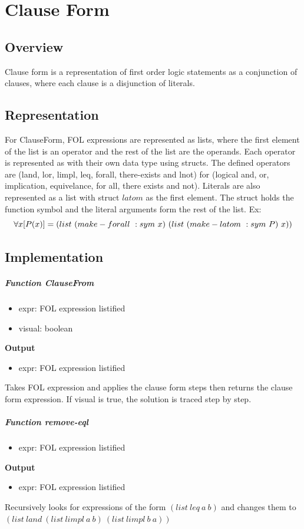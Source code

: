 \documentclass[paper=a4, fontsize=11pt]{scrartcl}
\numberwithin{equation}{section}		%
\numberwithin{figure}{section}			%
\numberwithin{table}{section}				%
\begin{document}
\section{Clause Form}
\subsection{Overview}
Clause form is a representation of first order logic
statements as a conjunction of clauses, where each clause is a disjunction of
literals.


\subsection{Representation}
For ClauseForm, FOL expressions are represented as lists, where the first
element of the list is an operator and the rest of the list are the operands.
Each operator is represented as with their own data type using structs. The
defined operators are (land, lor, limpl, leq, forall, there-exists and lnot) for
(logical and, or, implication, equivelance, for all, there exists and not).
Literals are also represented as a list with struct $latom$ as the first
element. The struct holds the function symbol and the literal arguments form the
rest of the list. 
Ex: \\
\[
  \forall x[P(x)] = \\
  (list\ (make-forall\ :sym\ x)\ (list\ (make-latom\ :sym\ P)\
  x)) 
\]

\subsection{Implementation}


\subparagraph{Function ClauseFrom}
\begin{itemize}
  \item {expr:} FOL expression listified
  \item{visual:} boolean
\end{itemize}
\noindent\textbf{Output}
\begin{itemize}
    \item{expr:} FOL expression listified
\end{itemize}
Takes FOL expression and applies the clause form steps then returns the clause
form expression. If visual is true, the solution is traced step by step.

\subparagraph{Function remove-eql}
\begin{itemize}
  \item {expr:} FOL expression listified
\end{itemize}
\noindent\textbf{Output}
\begin{itemize}
    \item{expr:} FOL expression listified
\end{itemize}
Recursively looks for expressions of the form $ (list\ leq\ a\ b) $ and changes
them to $(list\ land\ (list\ limpl\ a\ b)\ (list\ limpl\ b\ a))$
\end{document}
